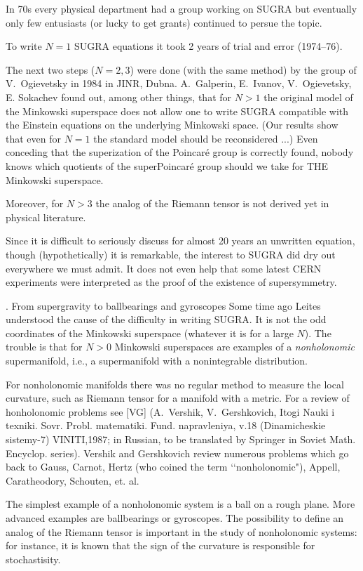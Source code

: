 In 70s every physical department had a group working on SUGRA but
eventually only few
entusiasts (or lucky to get grants) continued to persue the topic. 

To write $N=1$ SUGRA equations it took 2 years of trial and error (1974--76). 

The next two steps ($N=2, 3$) were done (with the same  method) by the group of
V.~Ogievetsky in 1984 in JINR, Dubna. A.~Galperin,  E.~Ivanov,
V.~Ogievetsky, E. Sokachev
found out, among other things, that for $N>1$ the original model of the
Minkowski superspace
does not allow one to write SUGRA compatible with  the
Einstein equations on the underlying Minkowski space. (Our results show
that even for $N=1$
the standard model should be reconsidered ...) Even conceding that the
superization of the
Poincar\'e group is correctly found, nobody knows which quotients of the
superPoincar\'e group should we take for THE Minkowski superspace.
 	
Moreover, for $N>3$ the analog of the Riemann tensor is not derived yet in
physical
literature. 

Since it is difficult to seriously discuss for almost 20 years an unwritten
 equation,
though (hypothetically) it is remarkable, the interest to  SUGRA did dry
out everywhere
we must admit. It does not even help that some latest CERN experiments were
interpreted as
the proof of the existence of supersymmetry.

. From supergravity to ballbearings and gyroscopes\endsubhead
Some time ago Leites understood the cause of the difficulty in writing
SUGRA. It is not the 
odd coordinates of the Minkowski superspace (whatever it is for a large $N$). 
The trouble is that for $N>0$ Minkowski superspaces are examples of a 
{\it nonholonomic} supermanifold, i.e., a supermanifold with a nonintegrable 
distribution. 

For nonholonomic manifolds there was no regular method to measure the 
local curvature, such as Riemann tensor for a manifold with a metric. For a
review of
honholonomic problems see [VG] (A.~Vershik,  V.~Gershkovich, Itogi Nauki i
texniki.
Sovr. Probl. matematiki. Fund.  napravleniya, v.18 (Dinamicheskie
sistemy-7) VINITI,1987; in
Russian, to be translated by Springer in Soviet Math. Encyclop. series).
Vershik and 
Gershkovich review numerous problems which go back to Gauss, Carnot, Hertz 
(who coined the term \lq\lq nonholonomic"), Appell, Caratheodory, Schouten, 
et. al.

The simplest example of a nonholonomic system is a ball on a rough plane. More
advanced examples are ballbearings or gyroscopes. The possibility to define an
analog of the Riemann tensor is important in the study of nonholonomic systems:
for instance, it is known that the sign of the curvature is responsible for
stochastisity.

